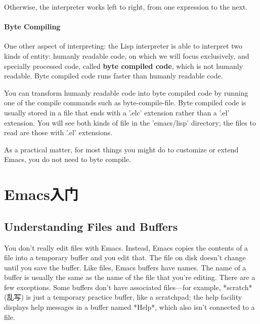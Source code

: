 \documentclass[12pt]{book}
\begin{document}
Otherwise, the interpreter works left to right, from one expression to the next.
\subsubsection{Byte Compiling}
One other aspect of interpreting: the Lisp interpreter is able to interpret two kinds of entity: humanly readable code, on which we will focus exclusively, and specially processed code, called {\bf byte compiled code}, which is not humanly readable. Byte compiled code runs faster than humanly readable code.

You can transform humanly readable code into byte compiled code by running one of the compile commands such as byte-compile-file. Byte compiled code is usually stored in a file that ends with a '.elc' extension rather than a '.el' extension. You will see both kinds of file in the 'emacs/lisp' directory; the files to read are those with '.el' extensions.

As a practical matter, for most things you might do to customize or extend Emacs, you do not need to byte compile.











\chapter{Emacs入门}
\section{Understanding Files and Buffers}
You don't really edit files with Emacs. Instead, Emacs copies the contents of a file into a temporary buffer and you edit that. The file on disk doesn't change until you save the buffer. Like files, Emacs buffers have names. The name of a buffer is usually the same as the name of the file that you're editing. There are a few exceptions. Some buffers don't have associated files—for example, *scratch*(乱写) is just a temporary practice buffer, like a scratchpad; the help facility displays help messages in a buffer named *Help*, which also isn't connected to a file.
\end{document}

